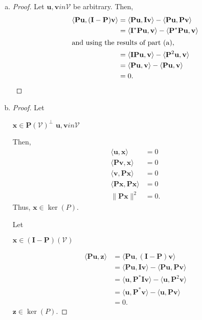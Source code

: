 \documentclass[12pt]{amsart}
\newcommand{\1}{\mathbbm{1}}
\numberwithin{equation}{section}
\numberwithin{Theorem}{section}
\theoremstyle{plain} %
\theoremstyle{definition}
\theoremstyle{remark}
\begin{document}
\begin{enumerate}[1.]
\begin{enumerate}[(a)]
	\item 
	\begin{proof}
		Let \(\mathbf{u},\mathbf{v}in\mathcal{V}\) be arbitrary.
		Then,
		\begin{align*}
			\langle \mathbf{P} \mathbf{u}, (\mathbf{I}-\mathbf{P}) \mathbf{v} \rangle
			&= \langle \mathbf{P} \mathbf{u}, \mathbf{I} \mathbf{v} \rangle - \langle \mathbf{P} \mathbf{u}, \mathbf{P} \mathbf{v} \rangle \\
			&= \langle \mathbf{I^*} \mathbf{P} \mathbf{u}, \mathbf{v} \rangle - \langle \mathbf{P^*} \mathbf{P} \mathbf{u},  \mathbf{v} \rangle \\
			\intertext{and using the results of part (a),}
			&= \langle \mathbf{I} \mathbf{P} \mathbf{u}, \mathbf{v} \rangle - \langle \mathbf{P}^2 \mathbf{u},  \mathbf{v} \rangle \\
			&= \langle \mathbf{P} \mathbf{u}, \mathbf{v} \rangle - \langle \mathbf{P} \mathbf{u},  \mathbf{v} \rangle \\
			&= 0.
		\end{align*}
	\end{proof}
	
	\item 
	\begin{proof}
		Let 
		
		\(\mathbf{x}\in\mathbf{P}(\mathcal{V})^\perp\)
		\(\mathbf{u},\mathbf{v}in\mathcal{V}\)
		
		
		Then,
		\begin{align*}
			\langle \mathbf{u}, \mathbf{x} \rangle &= 0 \\
			\langle \mathbf{Pv}, \mathbf{x} \rangle &= 0 \\
			\langle \mathbf{v}, \mathbf{Px} \rangle &= 0 \\
			\langle \mathbf{Px}, \mathbf{Px} \rangle &= 0 \\
			\|\mathbf{Px}\|^2 &= 0.
		\end{align*}
		Thus, \(\mathbf{x}\in\operatorname{ker}(P)\).
		
		Let
		
		\(\mathbf{x}\in(\mathbf{I}-\mathbf{P})(\mathcal{V})\)
		
		\begin{align*}
			\langle \mathbf{P}\mathbf{u}, \mathbf{z} \rangle
			&= \langle \mathbf{P} \mathbf{u}, (\mathbf{I}-\mathbf{P}) \mathbf{v} \rangle \\
			&= \langle \mathbf{P} \mathbf{u}, \mathbf{I} \mathbf{v} \rangle - \langle \mathbf{P} \mathbf{u}, \mathbf{P} \mathbf{v} \rangle \\
			&= \langle \mathbf{u}, \mathbf{P^*}\mathbf{I} \mathbf{v} \rangle - \langle \mathbf{u}, \mathbf{P}^2 \mathbf{v} \rangle \\
			&= \langle \mathbf{u}, \mathbf{P^*} \mathbf{v} \rangle - \langle \mathbf{u}, \mathbf{P} \mathbf{v} \rangle \\
			&= 0.
		\end{align*}
		\(\mathbf{z}\in\operatorname{ker}(P)\).
		

\end{proof}
\end{enumerate}
\end{enumerate}
\end{document}
